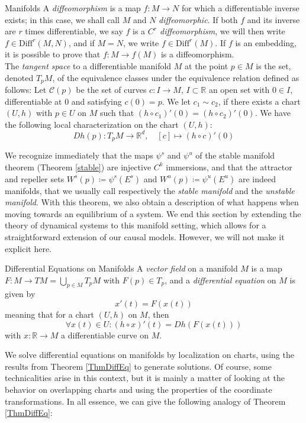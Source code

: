 \documentclass[11pt, a4paper]{memoir}
\theoremstyle{break}
\theoremstyle{break}
\theoremstyle{nonumberplain}
\newcommand{\mR}{\mathbb{R}}
\begin{document}
\begin{mydefinition}{Manifolds}
A \emph{diffeomorphism} is a map $f:M\to N$ for which a differentiable inverse exists; in this case, we shall call $M$ and $N$ \emph{diffeomorphic}. If both $f$ and its inverse are $r$ times differentiable, we say $f$ is a \emph{$C^r$ diffeomorphism}, we will then write $f\in \text{Diff}^r(M,N)$, and if $M=N$, we write $f\in \text{Diff}^r(M)$. If $f$ is an embedding, it is possible to prove that $f:M\to f(M)$ is a diffeomorphism.\\[5pt]
The \emph{tangent space} to a differentiable manifold $M$ at the point $p\in M$ is the set, denoted $T_pM$, of the equivalence classes under the equivalence relation defined as follows: Let $\mathcal{C}(p)$ be the set of curves $c:I\to M$, $I\subset \mR$ an open set with $0\in I$, differentiable at $0$ and satisfying $c(0)=p$. We let $c_1\sim c_2$, if there exists a chart $(U,h)$ with $p\in U$ on $M$ such that $(h\circ c_1)'(0)=(h\circ c_2)'(0)$. We have the following local characterization on the chart $(U,h)$:
$$Dh(p):T_pM\to\mR^d,\quad [c]\mapsto (h\circ c)'(0)$$
\end{mydefinition}
\noindent We recognize immediately that the maps $\psi^s$ and $\psi^u$ of the stable manifold theorem (Theorem \ref{stable}) are injective $C^k$ immersions, and that the attractor and repeller sets $W^s(p)\coloneqq \psi^s(E^s)$ and $W^u(p)\coloneqq \psi^u(E^u)$ are indeed manifolds, that we usually call respectively the \emph{stable manifold} and the \emph{unstable manifold}. With this theorem, we also obtain a description of what happens when moving towards an equilibrium of a system. We end this section by extending the theory of dynamical systems to this manifold setting, which allows for a straightforward extension of our causal models. However, we will not make it explicit here. 
\begin{mydefinition}{Differential Equations on Manifolds}
A \emph{vector field} on a manifold $M$ is a map $F:M\to TM=\bigcup_{p\in M}T_pM$ with $F(p)\in T_p$, and a \emph{differential equation} on $M$ is given by
\begin{equation}\label{diffeqmanif}
x'(t)=F(x(t))
\end{equation}
meaning that for a chart $(U,h)$ on $M$, then
$$\forall x(t)\in U: (h\circ x)'(t)=Dh(F(x(t)))$$
with $x:\mR\to M$ a differentiable curve on $M$.
\end{mydefinition}
We solve differential equations on manifolds by localization on charts, using the results from Theorem \ref{ThmDiffEq} to generate solutions. Of course, some technicalities arise in this context, but it is mainly a matter of looking at the behavior on overlapping charts and using the properties of the coordinate transformations. In all essence, we can give the following analogy of Theorem \ref{ThmDiffEq}:
\end{document}
